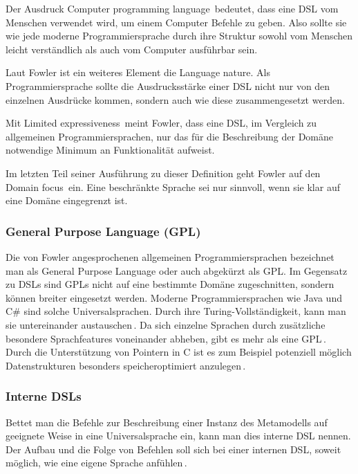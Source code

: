 \documentclass[12pt,oneside,a4paper,parskip]{scrbook}
\begin{document}
Der Ausdruck \glqq Computer programming language\grqq\ bedeutet, dass eine DSL vom Menschen verwendet wird, um einem Computer Befehle zu geben. Also sollte sie wie jede moderne Programmiersprache durch ihre Struktur sowohl vom Menschen leicht verständlich als auch vom Computer ausführbar sein.

Laut Fowler ist ein weiteres Element die \glqq Language nature\grqq. Als Programmiersprache sollte die Ausdrucksstärke einer DSL nicht nur von den einzelnen Ausdrücke kommen, sondern auch wie diese zusammengesetzt werden.

Mit \glqq Limited expressiveness\grqq\ meint Fowler, dass eine DSL, im Vergleich zu allgemeinen Programmiersprachen, nur das für die Beschreibung der Domäne notwendige Minimum an Funktionalität aufweist.

Im letzten Teil seiner Ausführung zu dieser Definition geht Fowler auf den \glqq Domain focus\grqq\ ein. Eine beschränkte Sprache sei nur sinnvoll, wenn sie klar auf eine Domäne eingegrenzt ist.

\subsubsection{General Purpose Language (GPL)}

Die von Fowler angesprochenen allgemeinen Programmiersprachen bezeichnet man als General Purpose Language oder auch abgekürzt als GPL. Im Gegensatz zu DSLs sind GPLs nicht auf eine bestimmte Domäne zugeschnitten, sondern können breiter eingesetzt werden. Moderne Programmiersprachen wie Java und C\# sind solche Universalsprachen. Durch ihre Turing-Vollständigkeit, kann man sie untereinander austauschen\,\cite[S.\,111]{hromkovic2014}. Da sich einzelne Sprachen durch zusätzliche besondere Sprachfeatures voneinander abheben, gibt es mehr als eine GPL\,\cite[S.\,27]{voelter2013}. Durch die Unterstützung von Pointern in C ist es zum Beispiel potenziell möglich Datenstrukturen besonders speicheroptimiert anzulegen\,\cite[S.\,93ff.]{kernighan1988}.

\subsubsection{Interne DSLs}

Bettet man die Befehle zur Beschreibung einer Instanz des Metamodells auf geeignete Weise in eine Universalsprache ein, kann man dies interne DSL nennen. Der Aufbau und die Folge von Befehlen soll sich bei einer internen DSL, soweit möglich, wie eine eigene Sprache anfühlen\,\cite[S 28]{fowler2010}.
\end{document}
